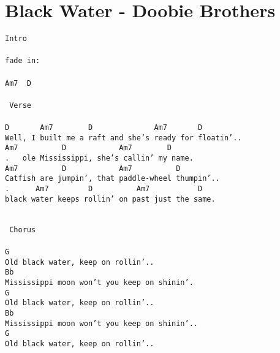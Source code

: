 \newpage
\section{Black Water - Doobie Brothers}
\label{Black Water - Doobie Brothers}
\texttt{Intro\\
\\
fade\ in:\\
\\
Am7\ \ D\\
\\
\lbrack\ Verse\rbrack\\
\\
D\ \ \ \ \ \ \ Am7\ \ \ \ \ \ \ \ D\ \ \ \ \ \ \ \ \ \ \ \ \ \ Am7\ \ \ \ \ \ \ D\ \\
Well,\ I\ built\ me\ a\ raft\ and\ she's\ ready\ for\ floatin'..\\
Am7\ \ \ \ \ \ \ \ \ \ D\ \ \ \ \ \ \ \ \ \ \ \ Am7\ \ \ \ \ \ \ \ D\ \\
. \ \ ole\ Mississippi,\ she's\ callin'\ my\ name.\\
Am7\ \ \ \ \ \ \ \ \ \ D\ \ \ \ \ \ \ \ \ \ \ \ Am7\ \ \ \ \ \ \ \ \ \ D\ \\
Catfish\ are\ jumpin',\ that\ paddle-wheel\ thumpin'..\\
. \ \ \ \ \ Am7\ \ \ \ \ \ \ \ \ D\ \ \ \ \ \ \ \ \ \ Am7\ \ \ \ \ \ \ \ \ \ \ D\\
black\ water\ keeps\ rollin'\ on\ past\ just\ the\ same.\\
\ \ \\
\ \ \ \\
\lbrack\ Chorus\rbrack\\
\\
G\\
Old\ black\ water,\ keep\ on\ rollin'..\ \ \ \\
Bb\ \ \ \ \ \ \ \ \ \ \ \ \ \ \ \ \ \ \ \ \ \ \ \ \ \ \ \ \ \ \ \ \ \ \ \ \ \ \ \ \ \ \ \ \ \\
Mississippi\ moon\ won't\ you\ keep\ on\ shinin'.\\
G\ \ \ \ \ \ \ \ \ \ \ \ \ \ \ \ \ \ \ \ \ \ \ \ \ \ \ \ \ \ \ \ \ \ \ \ \ \ \ \ \ \ \ \ \ \ \ \ \\
Old\ black\ water,\ keep\ on\ rollin'..\\
Bb\ \ \ \ \ \ \ \ \ \ \ \ \ \ \ \ \ \ \ \ \ \ \ \ \ \ \ \ \ \ \ \ \ \ \ \ \ \ \ \ \ \ \ \ \\
Mississippi\ moon\ won't\ you\ keep\ on\ shinin'..\\
G\\
Old\ black\ water,\ keep\ on\ rollin'..\\
}
